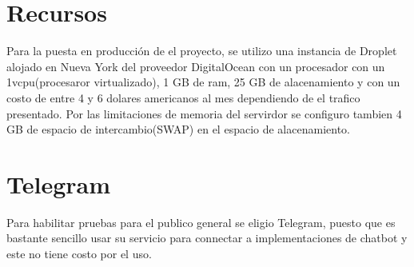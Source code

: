 \section{Recursos}

Para la puesta en producción de el proyecto, se utilizo una instancia de Droplet alojado en Nueva York del proveedor DigitalOcean con un procesador con un 1vcpu(procesaror virtualizado), 1 GB de ram, 25 GB de alacenamiento y con un costo de entre 4 y 6 dolares americanos al mes dependiendo de el trafico presentado. Por las limitaciones de memoria del servirdor se configuro tambien 4 GB de espacio de intercambio(SWAP) en el espacio de alacenamiento.  

\section{Telegram}

Para habilitar pruebas para el publico general se eligio Telegram, puesto que es bastante sencillo usar su servicio para connectar a implementaciones de chatbot y este no tiene costo por el uso. \cite{botfather}
